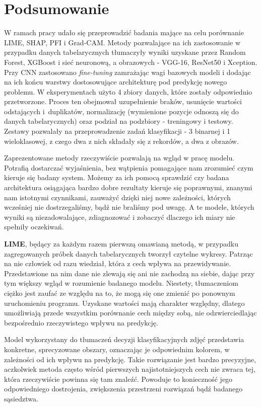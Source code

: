\section{Podsumowanie}
W ramach pracy udało się przeprowadzić badania mające na celu porównanie LIME, SHAP, PFI i Grad-CAM. Metody pozwalające na ich zastosowanie w przypadku danych tabelarycznych tłumaczyły wyniki uzyskane przez Random Forest, XGBoost i sieć neuronową, a obrazowych - VGG-16, ResNet50 i Xception. Przy CNN zastosowano \textit{fine-tuning} zamrażając wagi bazowych modeli i dodając na ich końcu warstwy dostosowujące architekturę pod predykcję nowego problemu. W eksperymentach użyto 4 zbiory danych, które zostały odpowiednio przetworzone. Proces ten obejmował uzupełnienie braków, usunięcie wartości odstających i~duplikatów, normalizację (wymienione pozycje odnoszą się do danych tabelarycznych) oraz podział na podzbiory - treningowy i testowy. Zestawy pozwalały na przeprowadzenie zadań klasyfikacji - 3 binarnej i 1 wieloklasowej, z czego dwa z nich składały się z rekordów, a dwa z obrazów.       

Zaprezentowane metody rzeczywiście pozwalają na wgląd w pracę modelu. Potrafią dostarczać wyjaśnienia, bez wątpienia pomagające nam zrozumieć czym kieruje się badany system. Możemy za ich pomocą sprawdzić czy badana architektura osiągająca bardzo dobre rezultaty kieruje się poprawnymi, znanymi nam istotnymi czynnikami, zauważyć dzięki niej nowe zależności, których wcześniej nie dostrzegaliśmy, bądź nie braliśmy pod uwagę. A te modele, których wyniki są niezadowalające, zdiagnozować i zobaczyć dlaczego ich miary nie spełniły oczekiwań.

\textbf{LIME}, będący za każdym razem pierwszą omawianą metodą, w przypadku zagregowanych próbek danych tabelarycznych tworzył czytelne wykresy. Patrząc na nie człowiek od razu wiedział, która z cech wpływa na przewidywanie. Przedstawione na nim dane nie zlewają się ani nie zachodzą na siebie, dając przy tym większy wgląd w rozumienie badanego modelu. Niestety, tłumaczeniom ciężko jest zaufać ze względu na to, że mogą się one zmienić po ponownym uruchomieniu programu. Uzyskane wartości mają charakter względny, dlatego umożliwiają przede wszystkim porównanie cech między sobą, nie odzwierciedlając bezpośrednio rzeczywistego wpływu na predykcję.

Model wykorzystany do tłumaczeń decyzji klasyfikacyjnych zdjęć przedstawia konkretne, sprecyzowane obszary, oznaczając je odpowiednim kolorem, w zależności od ich wpływu na predykcję. Takie rozwiązanie jest bardzo precyzyjne, aczkolwiek metoda często wśród pierwszych najistotniejszych cech nie zwraca tej, która rzeczywiście powinna się tam znaleźć. Powoduje to konieczność jego odpowiedniego dostrojenia, zwiększenia przestrzeni rozwiązań bądź badanego sąsiedztwa.

